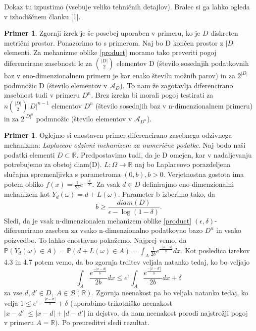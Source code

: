 \documentclass[12pt,a4paper]{amsart}
\theoremstyle{definition} %
\newtheorem{primer}[definicija]{Primer}
\theoremstyle{plain} %
\begin{document}
Dokaz tu izpustimo (vsebuje veliko tehničnih detajlov). Bralec si ga lahko ogleda v izhodiščnem članku [1].
\newline
\newline
\begin{primer} Zgornji izrek je še posebej uporaben v primeru, ko je $D$ diskreten metrični prostor. Ponazorimo to s primerom. Naj bo D končen prostor z $|D|$ elementi. Za mehanizme oblike \eqref{product} moramo tako preveriti pogoj diferencirane zasebnosti le za $\binom{|D|}{2}$ elementov D (število sosednjih podatkovnih baz v eno-dimenzionalnem primeru je kar enako številu možnih parov) in za $2^{|D|}$ podmnožic D (število elementov v $\mathcal{A}_D$). To nam že zagotavlja diferencirano zasebnost tudi v primeru $D^n$.  Brez izreka bi morali pogoj testirati za $n\binom{|D|}{2}|D|^{n-1}$ elementov $D^n$ (število sosednjih baz v n-dimenzionalnem primeru) in za $2^{|D|^n}$ podmnožic (število elementov v $\mathcal{A}_{D^n}$).
\end{primer}
\begin{primer}  Oglejmo si enostaven primer diferencirano zasebnega odzivnega mehanizma: \textit{Laplaceov odzivni mehanizem za numerične podatke}. Naj bodo naši podatki elementi $D \subset \mathbb{R}$. Predpostavimo tudi, da je D omejen, kar v nadaljevanju potrebujemo za obstoj diam(D). $L: \Omega \rightarrow \mathbb{R}$ naj bo Laplaceovo porazdeljena slučajna spremenljivka s parametroma $(0,b), b > 0$.  
Verjetnostna gostota ima potem obliko $f(x)=\frac{1}{2b}e^{-\frac{|x|}{b}}$.  Za vsak $d \in D$ definirajmo eno-dimenzionalni mehanizem kot  $Y_{d}(\omega) = d + L(\omega)$. Parameter b izberimo tako, da 
$$b\geq \frac{diam(D)}{\epsilon - \log(1-\delta)}.$$
Sledi, da je vsak n-dimenzionalen mehanizem oblike \eqref{product} $(\epsilon, \delta)$-diferencirano zaseben za vsako n-dimenzionalno podatkovno bazo $D^n$ in vsako poizvedbo. To lahko enostavno pokažemo. 
\newline
\newline
Najprej vemo, da $\mathbb{P}(Y_{d}(\omega) \in A) = \mathbb{P}(d + L(\omega) \in A) = \int_{A}\frac{1}{2b}e^{\frac{-|x-d|}{b}}dx$. Kot posledica izrekov 4.3 in 4.7 potem vemo, da bo zgornja trditev veljala natanko tedaj, ko bo veljajo 
$$\int_{A}\frac{e^{\frac{-|x-d|}{b}}}{2b}dx \leq e^{\epsilon}\int_{A}\frac{e^{\frac{-|x-d'|}{b}}}{2b}dx + \delta$$
za vse $d,d' \in D, \; A \in \mathcal{B}(\mathbb{R})$. Zgornja neenakost pa bo veljala natanko tedaj, ko velja $1 \leq e^{\epsilon - \frac{|d-d'|}{b}} + \delta$ (uporabimo trikotniško neenakost $|x-d'| \leq |x-d| + |d -d'|$ in dejstvo, da nam neenakost porodi najstrožji pogoj v primeru $A=\mathbb{R})$. Po preureditvi sledi rezultat. 
\end{primer}
\end{document}
